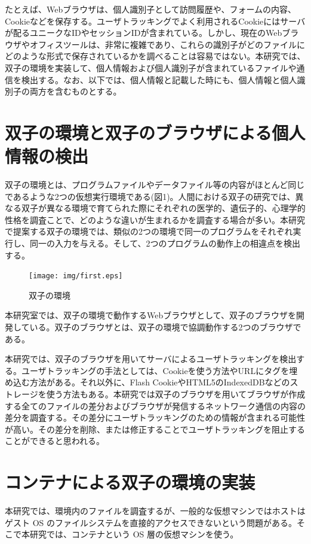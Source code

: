 \documentclass[a4paper,twocolumn,10pt]{jarticle}
\begin{document}
たとえば、Webブラウザは、個人識別子として訪問履歴や、フォームの内容、Cookieなどを保存する。ユーザトラッキングでよく利用されるCookieにはサーバが配るユニークなIDやセッションIDが含まれている。しかし、現在のWebブラウザやオフィスツールは、非常に複雑であり、これらの識別子がどのファイルにどのような形式で保存されているかを調べることは容易ではない。本研究では、双子の環境を実装して、個人情報および個人識別子が含まれているファイルや通信を検出する。なお、以下では、個人情報と記載した時にも、個人情報と個人識別子の両方を含むものとする。


\section{双子の環境と双子のブラウザによる個人情報の検出}

双子の環境とは、プログラムファイルやデータファイル等の内容がほとんど同じであるような2つの仮想実行環境である(図1)。人間における双子の研究では、異なる双子が異なる環境で育てられた際にそれぞれの医学的、遺伝子的、心理学的性格を調査ことで、どのような違いが生まれるかを調査する場合が多い。本研究で提案する双子の環境では、類似の2つの環境で同一のプログラムをそれぞれ実行し、同一の入力を与える。そして、2つのプログラムの動作上の相違点を検出する。

\begin{figure}[t]
\begin{center}
\texttt{[image: img/first.eps]}
\caption{双子の環境}
\label{figure:twin}
\end{center}
\end{figure}



本研究室では、双子の環境で動作するWebブラウザとして、双子のブラウザを開発している\cite{comsys}。双子のブラウザとは、双子の環境で協調動作する2つのブラウザである。

本研究では、双子のブラウザを用いてサーバによるユーザトラッキングを検出する。ユーザトラッキングの手法としては、Cookieを使う方法やURLにタグを埋め込む方法がある。それ以外に、Flash CookieやHTML5のIndexedDBなどのストレージを使う方法もある。本研究では双子のブラウザを用いてブラウザが作成する全てのファイルの差分およびブラウザが発信するネットワーク通信の内容の差分を調査する。その差分にユーザトラッキングのための情報が含まれる可能性が高い。その差分を削除、または修正することでユーザトラッキングを阻止することができると思われる。




\section{コンテナによる双子の環境の実装}
本研究では、環境内のファイルを調査するが、一般的な仮想マシンではホストはゲスト OS のファイルシステムを直接的アクセスできないという問題がある。そこで本研究では、コンテナという OS 層の仮想マシンを使う。
\end{document}
